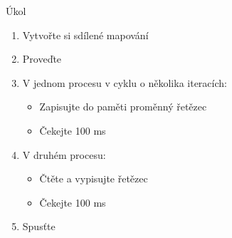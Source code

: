 \begin{frame}{Úkol}

  \begin{enumerate}
    \item Vytvořte si sdílené mapování
    \item Proveďte 

    \item V jednom procesu v cyklu o několika iteracích:
    \begin{itemize}
      \item Zapisujte do paměti proměnný řetězec
      \item Čekejte 100 ms
    \end{itemize}

    \item V druhém procesu:
    \begin{itemize}
      \item Čtěte a vypisujte řetězec
      \item Čekejte 100 ms
    \end{itemize}

    \item Spusťte
  \end{enumerate}

\end{frame}

